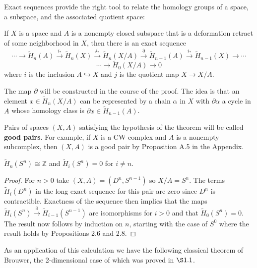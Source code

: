 Exact sequences provide the right tool to relate the homology groups of a space,
a subspace, and the associated quotient space:

\begin{theorem}
\label{thm:excision}
If $X$ is a space and $A$ is a nonempty closed subspace that is a deformation retract of some neighborhood in $X$, then there is an exact sequence
$$\cdots \to \tilde H_n(A) \xrightarrow{i_*} \tilde H_n(X) \xrightarrow{j_*} \tilde H_n(X/A) \xrightarrow{\partial} \tilde H_{n-1}(A) \xrightarrow{i_*} \tilde H_{n-1}(X) \to \cdots$$
$$\cdots \to \tilde H_0(X/A) \to 0$$
where $i$ is the inclusion $A \hookrightarrow X$ and $j$ is the quotient map $X \to X/A$.
\end{theorem}

The map $\partial$ will be constructed in the course of the proof. The idea is that an
element $x \in \tilde H_n(X/A)$ can be represented by a chain $\alpha$ in $X$ with $\partial\alpha$ a cycle in $A$
whose homology class is $\partial x \in \tilde H_{n-1}(A)$.

Pairs of spaces $(X,A)$ satisfying the hypothesis of the theorem will be called
\textbf{good pairs}. For example, if $X$ is a CW complex and $A$ is a nonempty subcomplex,
then $(X,A)$ is a good pair by Proposition A.5 in the Appendix.

\begin{corollary}
\label{cor:homology-spheres}
$\tilde H_n(S^n) \cong \mathbb{Z}$ and $\tilde H_i(S^n) = 0$ for $i \ne n$.
\end{corollary}
\begin{proof}
 For $n > 0$ take $(X,A) = (D^n,S^{n-1})$ so $X/A = S^n$. The terms $\tilde H_i(D^n)$ in the
long exact sequence for this pair are zero since $D^n$ is contractible. Exactness of the
sequence then implies that the maps $\tilde H_i(S^n) \xrightarrow{\partial} \tilde H_{i-1}(S^{n-1})$ are isomorphisms for
$i > 0$ and that $\tilde H_0(S^n) = 0$. The result now follows by induction on $n$, starting with
the case of $S^0$ where the result holds by Propositions 2.6 and 2.8.
\end{proof}
As an application of this calculation we have the following classical theorem of
Brouwer, the 2-dimensional case of which was proved in $\S1.1$.

